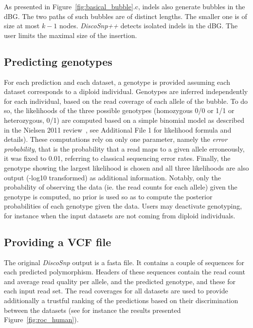 \documentclass{bmcart}
\newcommand{\disco}{{\it DiscoSnp}\xspace}
\newcommand{\discopp}{{\it DiscoSnp++}\xspace}
\begin{document}
As presented in Figure~\ref{fig:basical_bubble}.c, indels also generate bubbles in the dBG. The two paths of such bubbles are of distinct lengths. The smaller one is of size at most $k-1$ nodes. \discopp detects isolated indels in the dBG. The user limits the maximal size of the insertion. 

\subsection*{Predicting genotypes}
For each prediction and each dataset, a genotype is provided assuming each dataset corresponds to a diploid individual. Genotypes are inferred independently for each individual, based on the read coverage of each allele of the bubble. To do so, the likelihoods of the three possible genotypes (homozygous 0/0 or 1/1 or heterozygous, 0/1) are computed based on a simple binomial model as described in the Nielsen 2011 review~\cite{Nielsen2011}, see Additional File 1 for likelihood formula and details). These computations rely on only one parameter, namely the \emph{error probability}, that is the probability that a read maps to a given allele erroneously,
 it was fixed to 0.01, referring to classical sequencing error rates. Finally, the genotype showing the largest likelihood is chosen and all three likelihoods are also output (-log10 transformed) as additional information. Notably, only the probability of observing the data (ie. the read counts for each allele) given the genotype is computed, no prior is used so as to compute the posterior probabilities of each genotype given the data. Users may deactivate genotyping, for instance when the input datasets are not coming from diploid individuals.

\subsection*{Providing a VCF file}
The original \disco output is a fasta file. It contains a couple of sequences for each predicted polymorphism. Headers of these sequences contain the read count and average read quality per allele, and the predicted genotype, and these for each input read set. 
The read coverages for all datasets are used to provide additionally a trustful ranking of the predictions based on their discrimination between the datasets 
(see for instance the results presented Figure~\ref{fig:roc_human}).
\end{document}

